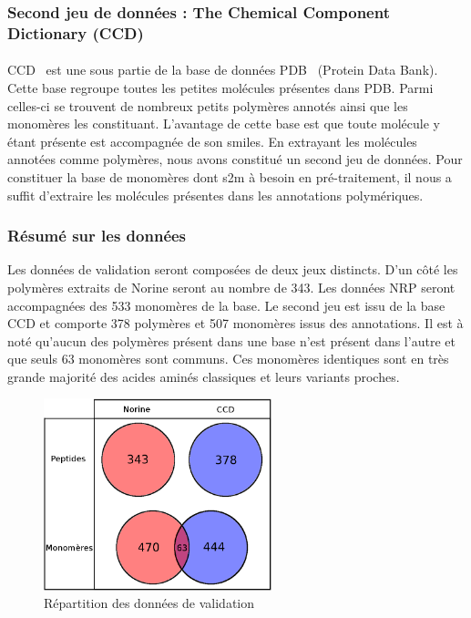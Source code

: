 \documentclass[12pt,french,twoside]{report}
\begin{document}
\subsubsection{Second jeu de données : The Chemical Component Dictionary (CCD)}

\paragraph{}CCD~\cite{westbrook_chemical_2015} est une sous partie de la base de données PDB~\cite{berman_protein_2000} (Protein Data Bank).
Cette base regroupe toutes les petites molécules présentes dans PDB.
Parmi celles-ci se trouvent de nombreux petits polymères annotés ainsi que les monomères les constituant.
L'avantage de cette base est que toute molécule y étant présente est accompagnée de son smiles.
En extrayant les molécules annotées comme polymères, nous avons constitué un second jeu de données.
Pour constituer la base de monomères dont s2m à besoin en pré-traitement, il nous a suffit d'extraire les molécules présentes dans les annotations polymériques.


\subsubsection{Résumé sur les données}

Les données de validation seront composées de deux jeux distincts.
D'un côté les polymères extraits de Norine seront au nombre de 343.
Les données NRP seront accompagnées des 533 monomères de la base.
Le second jeu est issu de la base CCD et comporte 378 polymères et 507 monomères issus des annotations.
Il est à noté qu'aucun des polymères présent dans une base n'est présent dans l'autre et que seuls 63 monomères sont communs.
Ces monomères identiques sont en très grande majorité des acides aminés classiques et leurs variants proches.

\begin{figure}[!h]
  \begin{center}
    \includegraphics[width=250px]{Figures/s2m/results/data.png}
    \caption{\label{data}Répartition des données de validation}
  \end{center}
\end{figure}
\end{document}
